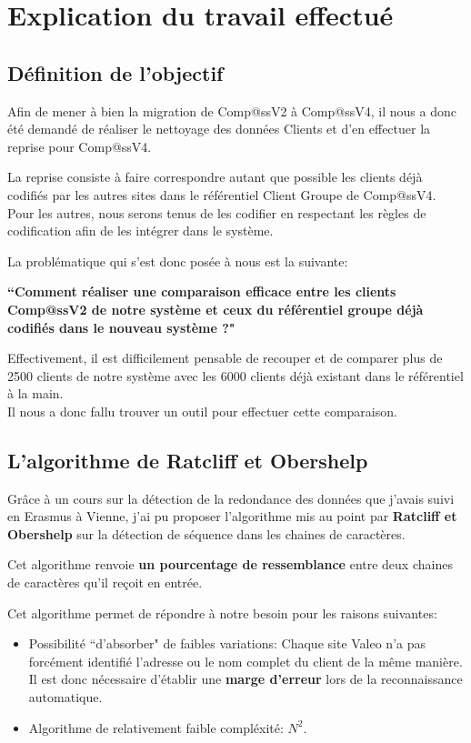 \section{Explication du travail effectué}

\subsection{Définition de l'objectif}

Afin de mener à bien la migration de Comp@ssV2 à Comp@ssV4, il nous a donc été demandé de réaliser le nettoyage des données Clients et d'en effectuer la reprise pour Comp@ssV4.

La reprise consiste à faire correspondre autant que possible les clients déjà codifiés par les autres sites dans le référentiel Client Groupe de Comp@ssV4. Pour les autres, nous serons tenus de les codifier en respectant les règles de codification afin de les intégrer dans le système.

La problématique qui s'est donc posée à nous est la suivante:

\textbf{``Comment réaliser une comparaison efficace entre les clients Comp@ssV2 de notre système et ceux du référentiel groupe déjà codifiés dans le nouveau système ?"}

Effectivement, il est difficilement pensable de recouper et de comparer plus de 2500 clients de notre système avec les 6000 clients déjà existant dans le référentiel à la main.\\
Il nous a donc fallu trouver un outil pour effectuer cette comparaison.

\clearpage

\subsection{L'algorithme de Ratcliff et Obershelp}

Grâce à un cours sur la détection de la redondance des données que j'avais suivi en Erasmus à Vienne, j'ai pu proposer l'algorithme mis au point par \textbf{Ratcliff et Obershelp} sur la détection de séquence dans les chaines de caractères.

Cet algorithme renvoie \textbf{un pourcentage de ressemblance} entre deux chaines de caractères qu'il reçoit en entrée.

Cet algorithme permet de répondre à notre besoin pour les raisons suivantes:


\begin{itemize}\itemsep7pt
	\item Possibilité ``d'absorber" de faibles variations: Chaque site Valeo n'a pas forcément identifié l'adresse ou le nom complet du client de la même manière. Il est donc nécessaire d'établir une \textbf{marge d'erreur} lors de la reconnaissance automatique.
	\item Algorithme de relativement faible compléxité: $N^2$.
\end{itemize}

